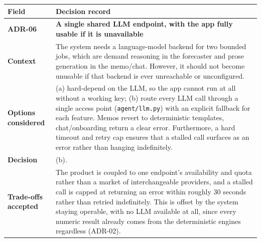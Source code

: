 \documentclass[
  11pt,
  a4paper,
  DIV=11,
  numbers=noendperiod,
  notitlepage]{scrreprt}
\newcounter{none} %
\begin{document}
{\def\LTcaptype{none} %
\begin{longtable}[]{@{}
  >{\raggedright\arraybackslash}p{}
  >{\raggedright\arraybackslash}p{}@{}}
\toprule\noalign{}
\begin{minipage}[b]{\linewidth}\raggedright
Field
\end{minipage} & \begin{minipage}[b]{\linewidth}\raggedright
Decision record
\end{minipage} \\
\midrule\noalign{}
\endhead
\bottomrule\noalign{}
\endlastfoot
\textbf{ADR-06} & \textbf{A single shared LLM endpoint, with the app
fully usable if it is unavailable} \\
\textbf{Context} & The system needs a language-model backend for two
bounded jobs, which are demand reasoning in the forecaster and prose
generation in the memo/chat. However, it should not become unusable if
that backend is ever unreachable or unconfigured. \\
\textbf{Options considered} & (a) hard-depend on the LLM, so the app
cannot run at all without a working key; (b) route every LLM call
through a single access point (\texttt{agent/llm.py}) with an explicit
fallback for each feature. Memos revert to deterministic templates,
chat/onboarding return a clear error. Furthermore, a hard timeout and
retry cap ensures that a stalled call surfaces as an error rather than
hanging indefinitely. \\
\textbf{Decision} & (b). \\
\textbf{Trade-offs accepted} & The product is coupled to one endpoint's
availability and quota rather than a market of interchangeable
providers, and a stalled call is capped at returning an error within
roughly 30 seconds rather than retried indefinitely. This is offset by
the system staying operable, with no LLM available at all, since every
numeric result already comes from the deterministic engines regardless
(ADR-02). \\
\end{longtable}
}
\end{document}
